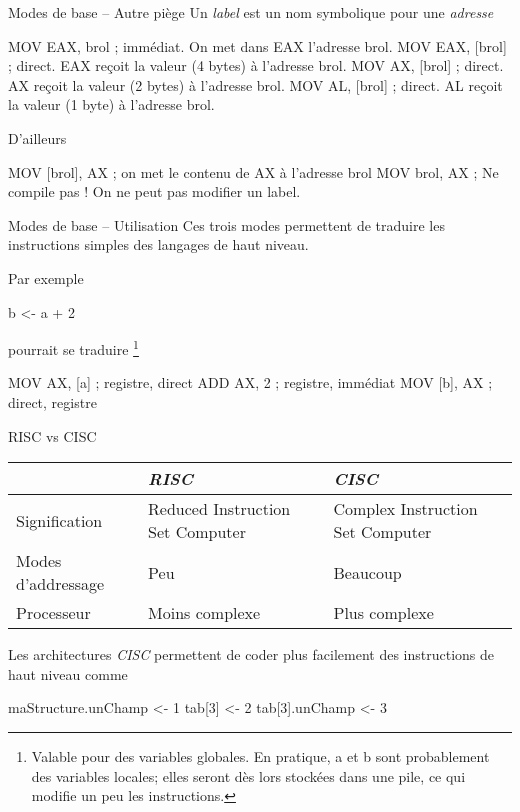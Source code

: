\documentclass[14pt]{beamer}
\begin{document}
\begin{frame}[fragile]{Modes de base -- Autre piège}
Un \emph{label} est un nom symbolique pour une \emph{adresse}
\begin{Asm}
	MOV EAX, brol     ; immédiat. On met dans EAX l'adresse brol.
	MOV EAX, [brol]   ; direct. EAX reçoit la valeur (4 bytes) à l'adresse brol.
	MOV AX, [brol]    ; direct. AX reçoit la valeur (2 bytes) à l'adresse brol.
	MOV AL, [brol]    ; direct. AL reçoit la valeur (1 byte) à l'adresse brol.
\end{Asm}
\bigskip
D'ailleurs
\begin{Asm}
	MOV [brol], AX    ; on met le contenu de AX à l'adresse brol
	MOV brol, AX      ; Ne compile pas ! On ne peut pas modifier un label.
\end{Asm}
\end{frame}

\begin{frame}[fragile]{Modes de base -- Utilisation}
Ces trois modes permettent de traduire les instructions simples
des langages de haut niveau.

\medskip
Par exemple
\begin{Code}
	b <- a + 2
\end{Code}
pourrait se traduire%
\footnote{
	\scriptsize{Valable pour des variables globales.
	En pratique, a et b sont probablement des variables locales;
	elles seront dès lors stockées dans une pile, ce qui modifie
	un peu les instructions.}
}
\begin{Asm}
	MOV AX, [a]   ; registre, direct
	ADD AX, 2     ; registre, immédiat
	MOV [b], AX   ; direct, registre
\end{Asm}
\end{frame}

\begin{frame}[fragile]{RISC vs CISC}

\begin{footnotesize}
\begin{tabular}{p{3cm}p{3cm}p{3cm}}
	& \emph{RISC} & \emph{CISC} \\\hline
Signification & Reduced Instruction Set Computer & Complex Instruction Set Computer \\\hline
Modes d'addressage & Peu & Beaucoup \\\hline
Processeur & Moins complexe & Plus complexe \\\hline
\end{tabular}
\end{footnotesize}

\bigskip
Les architectures \emph{CISC} permettent de coder plus facilement
des instructions de haut niveau comme
\begin{Code}
	maStructure.unChamp <- 1
	tab[3] <- 2
	tab[3].unChamp <- 3
\end{Code}
\end{frame}
\end{document}
